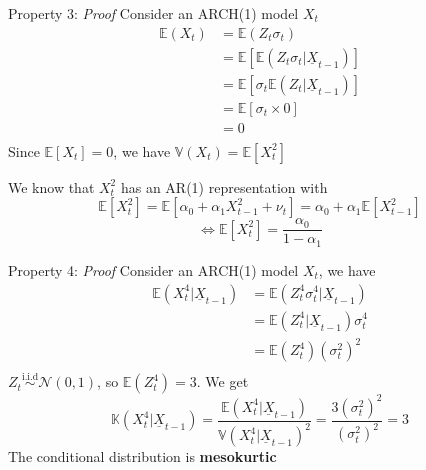 \documentclass{beamer}
\def\Esp{\mathbb{E}}
\def\Var{\mathbb{V}}
\def\Kurt{\mathbb{K}}
\def\N{\mathcal{N}}
\newcommand{\imfbold}[1]{\textbf{\textcolor{imfblue}{#1}}}
\begin{document}
\begin{frame}{Property 3: \emph{Proof}}
    Consider an ARCH(1) model $X_t$
    \begin{align*}
        \Esp(X_t) &= \Esp(Z_t\sigma_t)\\
                  &= \Esp[\Esp(Z_t\sigma_t|\underline{X}_{t-1})]\\
                  &= \Esp[\sigma_t\Esp(Z_t|\underline{X}_{t-1})]\\
                  &= \Esp[\sigma_t\times 0]\\
                  &=0\\
    \end{align*}
    Since $\Esp[X_t]=0$,  we have $\Var(X_t)=\Esp[X_t^2]$
    
    We know that $X_t^2$ has an AR(1) representation with 
    $$ \Esp[X_t^2] = \Esp[\alpha_0 + \alpha_1 X_{t-1}^2 + \nu_t] = \alpha_0 + \alpha_1 \Esp[X_{t-1}^2] $$
    $$ \Leftrightarrow \Esp[X_t^2] =\frac{\alpha_0}{1-\alpha_1} $$
\end{frame}
\begin{frame}{Property 4: \emph{Proof}}
Consider an ARCH(1) model $X_t$, we have
\begin{align*}
    \Esp(X_t^4|\underline{X}_{t-1}) &= \Esp(Z_t^4 \sigma_t^4|\underline{X}_{t-1})\\
                                    &= \Esp(Z_t^4|\underline{X}_{t-1}) \sigma_t^4\\
                                    &= \Esp(Z_t^4) (\sigma_t^2)^2\\
\end{align*}
$Z_t \overset{\mathrm{i.i.d}}{\sim} \N(0,1)$, so $\Esp(Z_t^4) = 3$. We get
$$ \Kurt(X_t^4|\underline{X}_{t-1}) = \frac{\Esp(X_t^4|\underline{X}_{t-1})}{\Var(X_t^4|\underline{X}_{t-1})^2} = \frac{3(\sigma_t^2)^2}{(\sigma_t^2)^2} =3  $$
The conditional distribution is \imfbold{mesokurtic}
\end{frame}
\end{document}

